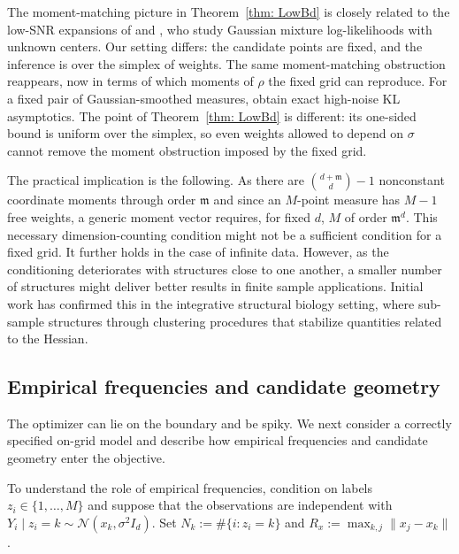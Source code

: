 \documentclass[12pt]{iopart}
\theoremstyle{remark}
\begin{document}
 The moment-matching picture in Theorem~\ref{thm: LowBd} is closely related to
the low-SNR expansions of \citet{katsevich2023likelihood} and
\citet{fan2024maximum}, who study Gaussian mixture log-likelihoods with
unknown centers.
Our setting differs: the candidate points are fixed,
and the inference is over the simplex of weights. The same
moment-matching obstruction reappears, now in terms of which moments of
$\rho$ the fixed grid can reproduce.
For a fixed pair of Gaussian-smoothed measures,
\citet{chen2021asymptotics} obtain exact high-noise KL asymptotics. The point
of Theorem~\ref{thm: LowBd} is different: its one-sided bound is uniform over
the simplex, so even weights allowed to depend on $\sigma$ cannot remove the
moment obstruction imposed by the fixed grid.




The practical implication is the following. 
As there are
$\binom{d+\mathfrak m}{d}-1$ nonconstant coordinate moments through order
$\mathfrak m$ and since an $M$-point measure has $M-1$ free weights, a generic
moment vector requires, for fixed $d$, $M$ of order $\mathfrak m^d$. This necessary
dimension-counting condition might not be a sufficient condition for a fixed grid.
It further holds in the case of infinite data. However, as the conditioning deteriorates with  structures close to one another, a smaller number of structures might deliver better results in finite sample applications. Initial work has confirmed this in the integrative structural biology setting, where \citet{mattingly2026measurement} sub-sample structures through clustering procedures that stabilize quantities related to the Hessian.  
 


 
 
\subsection{Empirical frequencies and candidate geometry}
\label{sec: Replica}

The optimizer can lie on the boundary and be spiky. We next consider a
correctly specified on-grid model and describe how empirical frequencies and
candidate geometry enter the objective.

To understand the role of empirical frequencies, condition on labels
$z_i\in\{1,\ldots,M\}$ and suppose that the observations are independent with
$Y_i\mid z_i=k\sim\mathcal N(x_k,\sigma^2I_d)$. Set
$N_k:=\#\{i:z_i=k\}$ and  $R_x:=\max_{k,j}\|x_j-x_k\|$.
\end{document}
